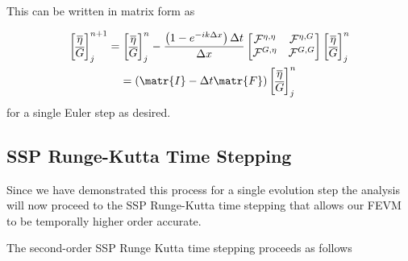 This can be written in matrix form as

\begin{multline}
\label{eqn:singleEvolveStep}
\begin{bmatrix}
\overline{\eta} \\ \overline{G}
\end{bmatrix}^{n+1}_j = \begin{bmatrix}
\overline{\eta} \\ \overline{G}
\end{bmatrix}^{n}_j - \frac{\left(1 - e^{-ik\Delta x}\right) \Delta t}{ \Delta x}\begin{bmatrix}
\mathcal{F}^{\eta,\eta} & \mathcal{F}^{\eta,G} \\\mathcal{F}^{G,\eta} &\mathcal{F}^{G,G} 
\end{bmatrix}\begin{bmatrix}
\overline{\eta} \\ \overline{G}
\end{bmatrix}^{n}_j \\= \left(\matr{I}  - \Delta t \matr{F} \right) \begin{bmatrix}
\overline{\eta} \\ \overline{G}
\end{bmatrix}^{n}_j
\end{multline}
for a single Euler step as desired.

\subsection{SSP Runge-Kutta Time Stepping}
\label{subsec:RKstepdisp}
Since we have demonstrated this process for a single evolution step the analysis will now proceed to the SSP Runge-Kutta time stepping that allows our FEVM to be temporally higher order accurate.

The second-order SSP Runge Kutta time stepping proceeds as follows

